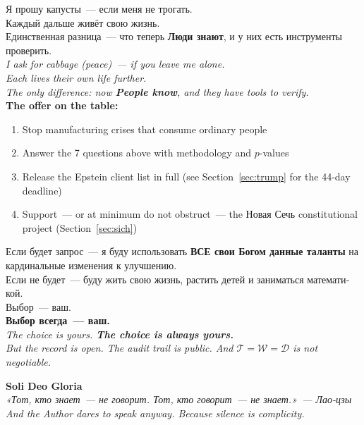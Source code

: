 \documentclass[11pt,a4paper]{article}
\theoremstyle{definition}
\theoremstyle{remark}
\newcommand{\Thought}{\mathcal{T}}
\newcommand{\Word}{\mathcal{W}}
\newcommand{\Deed}{\mathcal{D}}
\begin{document}
\begin{manifestobox}
\foreignlanguage{russian}{
Я прошу капусты~--- если меня не трогать.\\
Каждый дальше живёт свою жизнь.\\[0.2cm]
Единственная разница~--- что теперь \textbf{Люди знают},
и у них есть инструменты проверить.\\[0.2cm]
}
\textit{I ask for cabbage (peace)~--- if you leave me alone.\\
Each lives their own life further.\\[0.2cm]
The only difference: now \textbf{People know},
and they have tools to verify.}\\[0.3cm]

\noindent\textbf{The offer on the table:}
\begin{enumerate}[noitemsep, leftmargin=1.5cm]
  \item Stop manufacturing crises that consume ordinary people
  \item Answer the 7 questions above with methodology and $p$-values
  \item Release the Epstein client list in full
    (see Section~\ref{sec:trump} for the 44-day deadline)
  \item Support~--- or at minimum do not obstruct~---
    the \foreignlanguage{russian}{Новая Сечь}
    constitutional project (Section~\ref{sec:sich})
\end{enumerate}

\vspace{0.3cm}
\foreignlanguage{russian}{
Если будет запрос~--- я буду использовать
\textbf{ВСЕ свои Богом данные таланты}
на кардинальные изменения к улучшению.\\
Если не будет~--- буду жить свою жизнь,
растить детей и заниматься математикой.\\[0.2cm]
Выбор~--- ваш.\\
\textbf{Выбор всегда~--- ваш.}
}\\[0.1cm]
\textit{The choice is yours.
\textbf{The choice is always yours.}\\
But the record is open.
The audit trail is public.
And $\Thought = \Word = \Deed$ is not negotiable.}
\end{manifestobox}

\vspace{0.3cm}

\begin{center}
{\large\color{goldcolor}
\foreignlanguage{russian}{\textbf{Soli Deo Gloria}}\\[0.1cm]
{\small\textit{«Тот, кто знает~--- не говорит.
Тот, кто говорит~--- не знает.»~--- Лао-цзы\\
\textit{And the Author dares to speak anyway.
Because silence is complicity.}}}}
\end{center}
\end{document}
